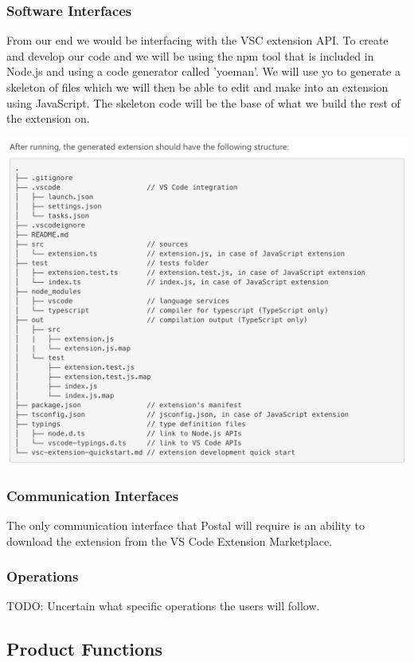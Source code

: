 \documentclass[letterpaper,10pt,titlepage,draftclsnofoot,onecolumn] {IEEEtran}
\begin{document}
\subsubsection{Software Interfaces}
From our end we would be interfacing with the VSC extension API. To create and develop our code and we will be using the npm tool that is included in Node.js and using a code generator called 'yoeman'. We will use yo to generate a skeleton of files which we will then be able to edit and make into an extension using JavaScript. The skeleton code will be the base of what we build the rest of the extension on. 

\includegraphics[scale=0.5]{fileStructure.png}
\subsubsection{Communication Interfaces}
The only communication interface that Postal will require is an ability to download the extension from the VS Code Extension Marketplace. 

\subsubsection{Operations}
TODO: Uncertain what specific operations the users will follow.

\subsection{Product Functions}
\end{document}
